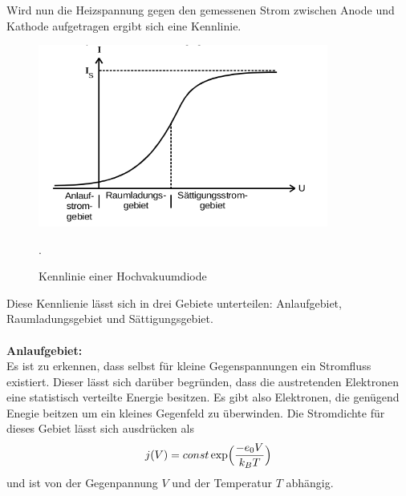 Wird nun die Heizspannung gegen den gemessenen Strom zwischen Anode und Kathode aufgetragen
ergibt sich eine Kennlinie.

\begin{figure}[H]
  \centering
  \includegraphics[height=6cm]{Kennlinie.png}
  \caption{Kennlinie einer Hochvakuumdiode}
  \label{fig:kenn}
  \cite{skript}.
\end{figure}

Diese Kennlienie lässt sich in drei Gebiete unterteilen: Anlaufgebiet, Raumladungsgebiet und
Sättigungsgebiet.\\
\\
\textbf{Anlaufgebiet:}\\
Es ist zu erkennen, dass selbst für kleine Gegenspannungen ein Stromfluss existiert.
Dieser lässt sich darüber begründen, dass die austretenden Elektronen eine statistisch
verteilte Energie besitzen. Es gibt also Elektronen, die genügend Enegie beitzen
um ein kleines Gegenfeld zu überwinden. Die Stromdichte für dieses Gebiet lässt sich
ausdrücken als
\begin{equation}
  j(V)=const\exp\Bigl({\frac{-e_{0}V}{k_{B}T}}\Bigr)
  \label{eqn:anlauf}
\end{equation}
und ist von der Gegenpannung $V$ und der Temperatur $T$ abhängig.
\\

